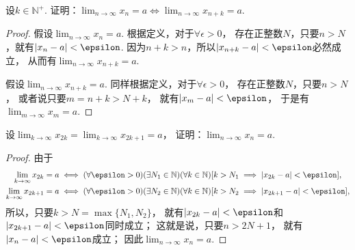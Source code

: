 \begin{example}\label{example:极限.指标变化时数列极限不变}
设\(k\in\mathbb{N}^+\).
证明：\(\lim_{n\to\infty} x_n = a \iff \lim_{n\to\infty} x_{n+k} = a\).
\begin{proof}
假设\(\lim_{n\to\infty} x_n = a\).
根据定义，对于\(\forall\epsilon>0\)，
存在正整数\(N\)，只要\(n>N\)，就有\(\abs{x_n-a}<\epsilon\).
因为\(n+k>n\)，所以\(\abs{x_{n+k}-a}<\epsilon\)必然成立，
从而有\(\lim_{n\to\infty} x_{n+k} = a\).

假设\(\lim_{n\to\infty} x_{n+k} = a\).
同样根据定义，对于\(\forall\epsilon>0\)，
存在正整数\(N\)，只要\(n>N\)，
或者说只要\(m=n+k>N+k\)，
就有\(\abs{x_m-a}<\epsilon\)，
于是有\(\lim_{m\to\infty} x_m = a\).
\end{proof}
\end{example}

\begin{example}
设\(\lim_{k\to\infty} x_{2k} = \lim_{k\to\infty} x_{2k+1} = a\)，
证明：\(\lim_{n\to\infty} x_n = a\).
\begin{proof}
由于\begin{gather*}
	\lim_{k\to\infty} x_{2k} = a
	\iff
	(\forall\epsilon>0)
	(\exists N_1\in\mathbb{N})
	(\forall k\in\mathbb{N})
	[
		k>N_1
		\implies
		\abs{x_{2k}-a}<\epsilon
	], \\
	\lim_{k\to\infty} x_{2k+1} = a
	\iff
	(\forall\epsilon>0)
	(\exists N_2\in\mathbb{N})
	(\forall k\in\mathbb{N})
	[
		k>N_2
		\implies
		\abs{x_{2k+1}-a}<\epsilon
	],
\end{gather*}
所以，只要\(k>N=\max\{N_1,N_2\}\)，
就有\(\abs{x_{2k}-a}<\epsilon\)和\(\abs{x_{2k+1}-a}<\epsilon\)同时成立；
这就是说，只要\(n>2N+1\)，
就有\(\abs{x_n-a}<\epsilon\)成立；
因此\(\lim_{n\to\infty} x_n = a\).
\end{proof}
\end{example}
